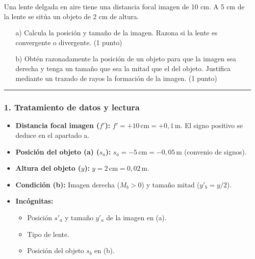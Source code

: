 \begin{cajaenunciado}
Una lente delgada en aire tiene una distancia focal imagen de 10 cm. A 5 cm de la lente se sitúa un objeto de 2 cm de altura.
\begin{enumerate}
    \item[a)] Calcula la posición y tamaño de la imagen. Razona si la lente es convergente o divergente. (1 punto)
    \item[b)] Obtén razonadamente la posición de un objeto para que la imagen sea derecha y tenga un tamaño que sea la mitad que el del objeto. Justifica mediante un trazado de rayos la formación de la imagen. (1 punto)
\end{enumerate}
\end{cajaenunciado}
\hrule

\subsubsection*{1. Tratamiento de datos y lectura}
\begin{itemize}
    \item \textbf{Distancia focal imagen ($f'$):} $f' = +10 \, \text{cm} = +0,1 \, \text{m}$. El signo positivo se deduce en el apartado a.
    \item \textbf{Posición del objeto (a) ($s_a$):} $s_a = -5 \, \text{cm} = -0,05 \, \text{m}$ (convenio de signos).
    \item \textbf{Altura del objeto ($y$):} $y = 2 \, \text{cm} = 0,02 \, \text{m}$.
    \item \textbf{Condición (b):} Imagen derecha ($M_b > 0$) y tamaño mitad ($y'_b = y/2$).
    \item \textbf{Incógnitas:}
    \begin{itemize}
        \item Posición $s'_a$ y tamaño $y'_a$ de la imagen en (a).
        \item Tipo de lente.
        \item Posición del objeto $s_b$ en (b).
    \end{itemize}
\end{itemize}

